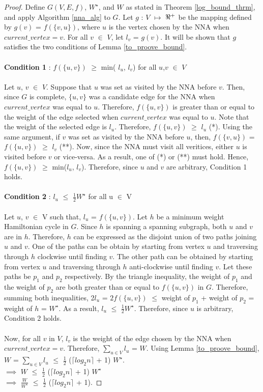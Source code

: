 \documentclass[12pt]{article}
\numberwithin{equation}{subsection}
\numberwithin{table}{subsection}
\numberwithin{algorithm}{subsection}
\numberwithin{figure}{subsection}
\begin{document}
\begin{proof}
Define $G(V,E,f)$, $W^\star$, and $W$ as stated in Theorem \ref{log_bound_thrm}, and apply Algorithm \ref{nna_alg} to $G$. Let $g$ : $V$ $\mapsto$ $\real^+$ be the mapping defined by $g(v)$ = $f(\{v,u\})$, where $u$ is the vertex chosen by the NNA when $current\_vertex = v$. For all $v$ $\in$ $V$, let $l_v$ = $g(v)$. It will be shown that $g$ satisfies the two conditions of Lemma \ref{to_proove_bound}.\\\\
\textbf{Condition 1} :  $f(\{u, v\})$ $\geq$ min( $l_u$, $l_v$) for all $u$,$v$ $\in$ $V$\\\\
Let $u$, $v$ $\in$ $V$. Suppose that $u$ was set as visited by the NNA before $v$. Then, since $G$ is complete, $\{u, v\}$ was a candidate edge for the NNA when $current\_vertex$ was equal to $u$. Therefore, $f(\{u, v\})$ is greater than or equal to the weight of the edge selected when $current\_vertex$ was equal to $u$. Note that the weight of the selected edge is $l_u$. Therefore, $f(\{u, v\})$ $\geq$ $l_u$ (*). Using the same argument, if $v$ was set as visited by the NNA before $u$, then, $f(\{v, u\})$ = $f(\{u, v\})$ $\geq$ $l_v$ (**). Now, since the NNA must visit all veritices, either $u$ is visited before $v$ or vice-versa. As a result, one of (*) or (**) must hold. Hence, $f(\{u, v\})$ $\geq$ min($l_u$, $l_v$). Therefore, since $u$ and $v$ are arbitrary, Condition 1 holds.\\\\
\textbf{Condition 2} :  $l_u$ $\leq$ $\frac{1}{2}W^\star$ for all u $\in$ V\\\\
Let  $u$, $v$ $\in$ V such that, $l_u$ = $f(\{u, v\})$. Let $h$ be a minimum weight Hamiltonian cycle in $G$. Since $h$ is spanning a spanning subgraph, both $u$ and $v$ are in $h$. Therefore, $h$ can be expressed as the disjoint union of two paths joining $u$ and $v$. One of the paths can be obtain by starting from vertex $u$ and traversing through $h$ clockwise until finding $v$. The other path can be obtained by starting from vertex $u$ and traversing through $h$ anti-clockwise until finding $v$. Let these paths be $p_1$ and $p_2$ respectively. By the triangle inequality, the weight of $p_1$ and the weight of $p_2$ are both greater than or equal to $f(\{u,v\})$ in $G$. Therefore, summing both inequalities, 2$l_u$ = $2f(\{u,v\})$ $\leq$ weight of $p_1$ + weight of $p_2$ = weight of $h$ = $W^\star$. As a result, $l_u$ $\leq$ $\frac{1}{2}W^\star$. Therefore, since $u$ is arbitrary, Condition 2 holds.\\\\Now, for all $v$ in $V$, $l_v$ is the weight of the edge chosen by the NNA when $current\_vertex = v$. Therefore, $\sum_{u \in V} l_u $ =  $W$. Using Lemma \ref{to_proove_bound}, $W$ = $\sum_{u \in V} l_u $ $\leq$ $\frac{1}{2}$ ($\lceil log_2 n \rceil$ + 1) $W^\star$.\\ $\implies$ $W$ $\leq$ $\frac{1}{2}$ ($\lceil log_2 n \rceil$ + 1) $W^\star$\\ $\implies$ $\frac{W}{W^\star}$ $\leq$ $\frac{1}{2}$ ($\lceil log_2 n \rceil$ + 1).
\end{proof}
\end{document}
